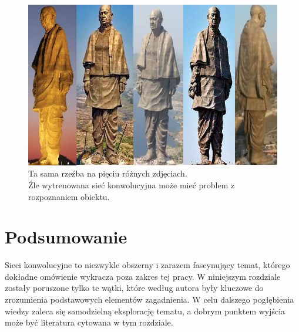 \begin{figure}[h]
\begin{center}
\includegraphics[width=15cm]{resources/figures/object_with_transitions.png}
\caption{Ta sama rzeźba na pięciu różnych zdjęciach. \\ Źle wytrenowana sieć konwolucyjna może mieć problem z rozpoznaniem obiektu.}
\label{SculptPhotos}
\end{center}
\end{figure}

\vspace{-0.7cm}
\section{Podsumowanie}
Sieci konwolucyjne to niezwykle obszerny i zarazem fascynujący temat, którego dokładne omówienie wykracza poza zakres tej pracy. W niniejszym rozdziale zostały poruszone tylko te wątki, które według autora były kluczowe do zrozumienia podstawowych elementów zagadnienia. W celu dalszego pogłębienia wiedzy zaleca się samodzielną eksplorację tematu, a dobrym punktem wyjścia może być literatura cytowana w tym rozdziale.